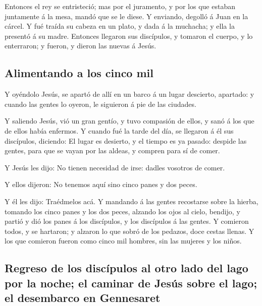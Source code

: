  Entonces el rey se entristeció; mas por el juramento, y por
los que estaban juntamente á la mesa, mandó que se le diese.
 Y enviando, degolló á Juan en la cárcel.  Y
fué traída su cabeza en un plato, y dada á la muchacha; y ella la
presentó á su madre.  Entonces llegaron sus discípulos, y
tomaron el cuerpo, y lo enterraron; y fueron, y dieron las nuevas á
Jesús.

\hypertarget{alimentando-a-los-cinco-mil}{%
\subsection{Alimentando a los cinco
mil}\label{alimentando-a-los-cinco-mil}}

 Y oyéndolo Jesús, se apartó de allí en un barco á un lugar
descierto, apartado: y cuando las gentes lo oyeron, le siguieron á pie
de las ciudades.

 Y saliendo Jesús, vió un gran gentío, y tuvo compasión de
ellos, y sanó á los que de ellos había enfermos.  Y cuando
fué la tarde del día, se llegaron á él sus discípulos, diciendo: El
lugar es desierto, y el tiempo es ya pasado: despide las gentes, para
que se vayan por las aldeas, y compren para sí de comer.

 Y Jesús les dijo: No tienen necesidad de irse: dadles
vosotros de comer.

 Y ellos dijeron: No tenemos aquí sino cinco panes y dos
peces.

 Y él les dijo: Traédmelos acá.  Y mandando á
las gentes recostarse sobre la hierba, tomando los cinco panes y los dos
peces, alzando los ojos al cielo, bendijo, y partió y dió los panes á
los discípulos, y los discípulos á las gentes.  Y comieron
todos, y se hartaron; y alzaron lo que sobró de los pedazos, doce cestas
llenas.  Y los que comieron fueron como cinco mil hombres,
sin las mujeres y los niños.

\hypertarget{regreso-de-los-discuxedpulos-al-otro-lado-del-lago-por-la-noche-el-caminar-de-jesuxfas-sobre-el-lago-el-desembarco-en-gennesaret}{%
\subsection{Regreso de los discípulos al otro lado del lago por la
noche; el caminar de Jesús sobre el lago; el desembarco en
Gennesaret}\label{regreso-de-los-discuxedpulos-al-otro-lado-del-lago-por-la-noche-el-caminar-de-jesuxfas-sobre-el-lago-el-desembarco-en-gennesaret}}

